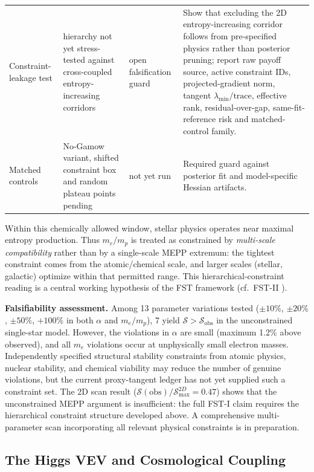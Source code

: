 \documentclass[12pt,a4paper]{article}
\theoremstyle{remark}
\begin{document}
\begin{table}[htbp]
\begin{tabularx}{\textwidth}{p{}p{}p{}Y}
Constraint-leakage test & hierarchy not yet stress-tested against cross-coupled entropy-increasing corridors & open falsification guard & Show that excluding the 2D entropy-increasing corridor follows from pre-specified physics rather than posterior pruning; report raw payoff source, active constraint IDs, projected-gradient norm, tangent $\lambda_{\min}/\mathrm{trace}$, effective rank, residual-over-gap, same-fit-reference risk and matched-control family. \\
Matched controls & No-Gamow variant, shifted constraint box and random plateau points pending & not yet run & Required guard against posterior fit and model-specific Hessian artifacts. \\
\bottomrule
\end{tabularx}
\endgroup
\end{table}

Within this chemically allowed window, stellar physics operates near maximal entropy production. Thus $m_e/m_p$ is treated as constrained by \emph{multi-scale compatibility} rather than by a single-scale MEPP extremum: the tightest constraint comes from the atomic/chemical scale, and larger scales (stellar, galactic) optimize within that permitted range. This hierarchical-constraint reading is a central working hypothesis of the FST framework (cf.\ FST-II \citep{FSTII}).

\textbf{Falsifiability assessment.} Among 13 parameter variations tested ($\pm 10\%$, $\pm 20\%$, $\pm 50\%$, $+100\%$ in both $\alpha$ and $m_e/m_p$), 7 yield $\mathcal{S} > \mathcal{S}_{\text{obs}}$ in the unconstrained single-star model. However, the violations in $\alpha$ are small (maximum 1.2\% above observed), and all $m_e$ violations occur at unphysically small electron masses. Independently specified structural stability constraints from atomic physics, nuclear stability, and chemical viability may reduce the number of genuine violations, but the current proxy-tangent ledger has not yet supplied such a constraint set. The 2D scan result ($\mathcal{S}(\text{obs})/\mathcal{S}_{\text{max}}^{2D} = 0.47$) shows that the unconstrained MEPP argument is insufficient: the full FST-I claim requires the hierarchical constraint structure developed above. A comprehensive multi-parameter scan incorporating all relevant physical constraints is in preparation.

\subsection{The Higgs VEV and Cosmological Coupling}
\end{document}
